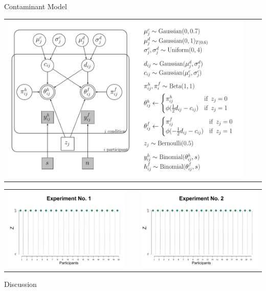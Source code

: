 \documentclass[final]{beamer}
\newlength{\onecolwid}
\begin{document}
\begin{frame}[t]
\begin{columns}[t]
\begin{column}{\onecolwid}
\begin{alertblock}{Contaminant Model}
\begin{center}
\begin{tabular}{ccc}
\includegraphics[width=0.7\linewidth]{Figures/4_Contaminant.pdf}
\end{tabular}
\end{center}


\begin{center}
\begin{tabular}{ccc}
\includegraphics[width=0.47\linewidth]{Figures/4-Exp1_Beta11.pdf}  & \hfill & \includegraphics[width=0.47\linewidth]{Figures/4-Exp2_Beta11-20.pdf}
\end{tabular}
\end{center}

\end{alertblock}



\begin{alertblock}{Discussion}


\end{alertblock}
\end{column}
\end{columns}
\end{frame}
\end{document}
